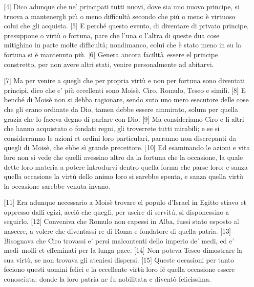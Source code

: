 {[}4{]} Dico adunque che ne' principati tutti nuovi, dove sia uno nuovo
principe, si truova a mantenergli più o meno difficultà secondo che più
o meno è virtuoso colui che gli acquista. {[}5{]} E perché questo
evento, di diventare di privato principe, presuppone o virtù o fortuna,
pare che l'una o l'altra di queste dua cose mitighino in parte molte
difficultà; nondimanco, colui che è stato meno in su la fortuna si è
mantenuto più. {[}6{]} Genera ancora facilità\est\ essere el principe
constretto, per non avere altri stati, venire personalmente ad abitarvi.

{[}7{]} Ma per venire a quegli che per propria virtù e non per fortuna
sono diventati principi, dico che e' più eccellenti sono Moisè, Ciro,
Romulo, Teseo e simili. {[}8{]} E benché di Moisè non si debba
ragionare, sendo suto uno mero esecutore delle cose che gli erano
ordinate da Dio, tamen debbe essere ammirato, solum per quella grazia
che lo faceva degno di parlare con Dio. {[}9{]} Ma consideriamo Ciro e
li altri che hanno acquistato o fondati regni, gli troverrete tutti
mirabili; e se si considerranno le azioni et ordini loro particulari,
parranno non discrepanti da quegli di Moisè, che ebbe sì grande
precettore. {[}10{]} Ed esaminando le azioni e vita loro non si vede che
quelli avessino altro da la fortuna che la occasione, la quale dette
loro materia a potere introdurvi dentro quella forma che parse loro: e
sanza quella occasione la virtù dello animo loro si sarebbe spenta, e
sanza quella virtù la occasione sarebbe venuta invano.

{[}11{]} Era adunque necessario a Moisè trovare el populo d'Israel in
Egitto stiavo et oppresso dalli egizi, acciò che quegli, per uscire di
servitú, si disponessino a seguirlo. {[}12{]} Conveniva che Romulo non
capessi in Alba, fussi stato esposto al nascere, a volere che diventassi
re di Roma e fondatore di quella patria. {[}13{]} Bisognava che Ciro
trovassi e' persi malcontenti dello imperio de' medi, ed e' medi\est\ molli
et effeminati per la lunga pace. {[}14{]} Non poteva Teseo dimostrare la
sua virtù, se non trovava gli ateniesi dispersi. {[}15{]} Queste
occasioni per tanto feciono questi uomini felici e la eccellente virtù
loro fé quella occasione essere conosciuta: donde la loro patria ne fu
nobilitata e diventò felicissima.

